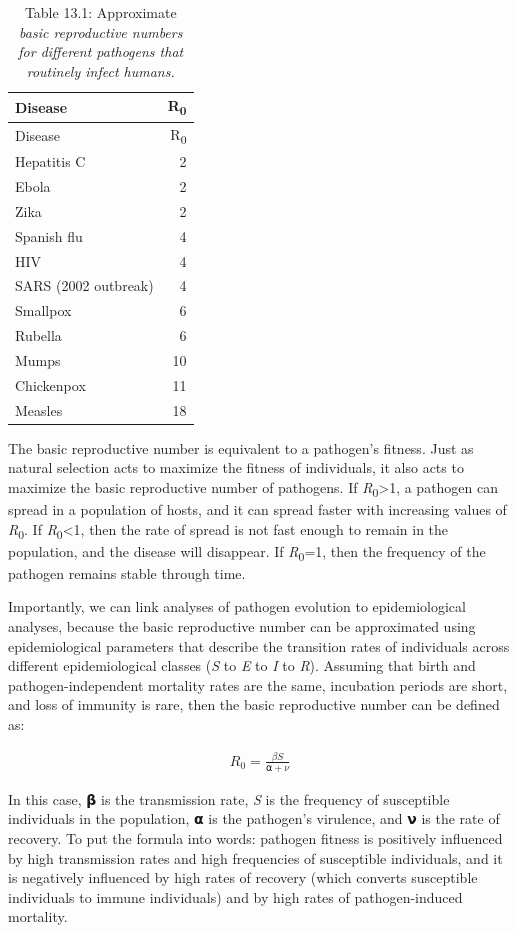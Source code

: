 \documentclass[
]{book}
\begin{document}
\begin{longtable}[]{@{}lr@{}}
\caption{Table 13.1: Approximate \emph{basic reproductive numbers for different pathogens that routinely infect humans.}}\tabularnewline
\toprule
Disease & R\textsubscript{0} \\
\midrule
\endfirsthead
\toprule
Disease & R\textsubscript{0} \\
\midrule
\endhead
Hepatitis C & 2 \\
Ebola & 2 \\
Zika & 2 \\
Spanish flu & 4 \\
HIV & 4 \\
SARS (2002 outbreak) & 4 \\
Smallpox & 6 \\
Rubella & 6 \\
Mumps & 10 \\
Chickenpox & 11 \\
Measles & 18 \\
\bottomrule
\end{longtable}

The basic reproductive number is equivalent to a pathogen's fitness. Just as natural selection acts to maximize the fitness of individuals, it also acts to maximize the basic reproductive number of pathogens. If \emph{R}\textsubscript{0}\textgreater1, a pathogen can spread in a population of hosts, and it can spread faster with increasing values of \emph{R}\textsubscript{0}. If \emph{R}\textsubscript{0}\textless1, then the rate of spread is not fast enough to remain in the population, and the disease will disappear. If \emph{R}\textsubscript{0}=1, then the frequency of the pathogen remains stable through time.

Importantly, we can link analyses of pathogen evolution to epidemiological analyses, because the basic reproductive number can be approximated using epidemiological parameters that describe the transition rates of individuals across different epidemiological classes (\emph{S} to \emph{E} to \emph{I} to \emph{R}). Assuming that birth and pathogen-independent mortality rates are the same, incubation periods are short, and loss of immunity is rare, then the basic reproductive number can be defined as:

\begin{align} 
R_0=\frac{βS}{⍺+ν} \label{eq:47}
\end{align}

In this case, 𝝱 is the transmission rate, \emph{S} is the frequency of susceptible individuals in the population, 𝝰 is the pathogen's virulence, and 𝝼 is the rate of recovery. To put the formula into words: pathogen fitness is positively influenced by high transmission rates and high frequencies of susceptible individuals, and it is negatively influenced by high rates of recovery (which converts susceptible individuals to immune individuals) and by high rates of pathogen-induced mortality.
\end{document}
